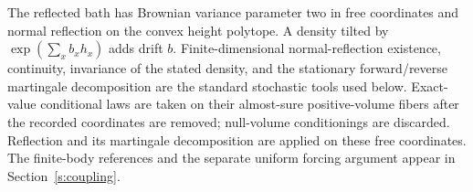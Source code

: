 \documentclass[11pt]{article}
\theoremstyle{definition}
\theoremstyle{remark}
\numberwithin{equation}{section}
\begin{document}
The reflected bath has Brownian variance parameter two in free coordinates
and normal reflection on the convex height polytope. A density tilted by
$\exp(\sum_xb_xh_x)$ adds drift $b$. Finite-dimensional normal-reflection
existence, continuity, invariance of the stated density, and the stationary
forward/reverse martingale decomposition are the standard stochastic tools
used below. Exact-value conditional laws are taken on their almost-sure
positive-volume fibers after the recorded coordinates are removed;
null-volume conditionings are discarded. Reflection and its martingale
decomposition are applied on these free coordinates. The finite-body
references and the separate uniform forcing argument appear in
Section~\ref{s:coupling}.









\end{document}
